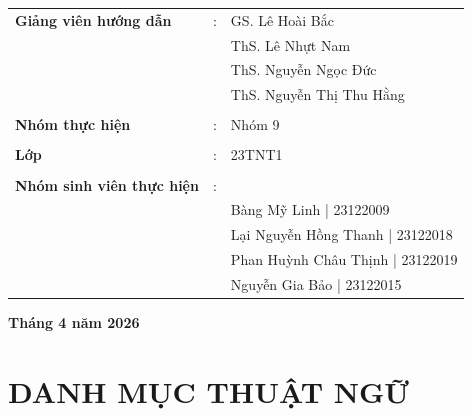 \documentclass[12pt,a4paper]{report}
\renewcommand{\contentsname}{\begin{center} \Large \bfseries MỤC LỤC \end{center}}
\begin{document}
\begin{center}
    \begin{tabular}{lll}
        \textbf{Giảng viên hướng dẫn} & : &GS. Lê Hoài Bắc \\
        & & ThS. Lê Nhựt Nam\\ & & ThS. Nguyễn Ngọc Đức \\ & & ThS. Nguyễn Thị Thu Hằng \\
        & & \\
        \textbf{Nhóm thực hiện} & : & Nhóm 9 \\
        & & \\
        \textbf{Lớp} & : & 23TNT1 \\
        & & \\
        \textbf{Nhóm sinh viên thực hiện} & : & \\
        & & Bàng Mỹ Linh \hspace{1.5cm} | 23122009 \\
        & & Lại Nguyễn Hồng Thanh \hspace{0.5cm} | 23122018 \\
        & & Phan Huỳnh Châu Thịnh \hspace{0.5cm} | 23122019 \\
        & & Nguyễn Gia Bảo \hspace{1.1cm} | 23122015 \\
    \end{tabular}
    
    \vfill
    {\Large\textbf{Tháng 4 năm 2026} \par}
\end{center}
\clearpage

\renewcommand{\chaptername}{Chương}
\renewcommand{\appendixname}{Phụ lục}
\renewcommand{\contentsname}{Mục lục}
\renewcommand{\listfigurename}{Danh sách hình ảnh}
\renewcommand{\listtablename}{Danh sách bảng}
\renewcommand{\bibname}{Tài liệu tham khảo}

\tableofcontents
\clearpage
\listoftables
\clearpage
\listoffigures
\clearpage

\chapter*{DANH MỤC THUẬT NGỮ}
\end{document}
